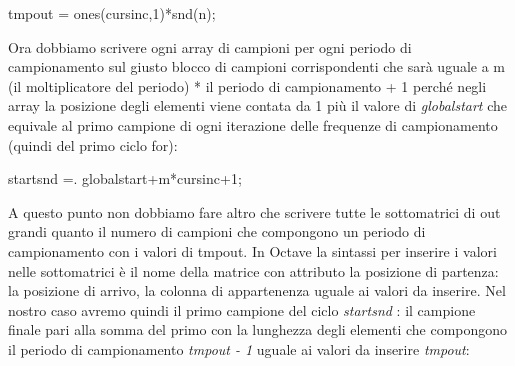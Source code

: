 \documentclass[11pt]{article}
\begin{document}
\begin{multicols*}{2}
\vspace{0.3cm}

\begin{center}
\begin{minipage}[c]{5.5cm}
\begin{sffamily}

tmpout = ones(cursinc,1)*snd(n);\\

\end{sffamily}
\end{minipage}
\end{center}

\noindent Ora dobbiamo scrivere ogni array di campioni per ogni periodo di campionamento sul giusto blocco di campioni corrispondenti che sarà uguale a m (il moltiplicatore del periodo) * il periodo di campionamento + 1 perché negli array la posizione degli elementi viene contata da 1 più il valore di \textit {globalstart} che equivale al primo campione di ogni iterazione delle frequenze di campionamento (quindi del primo ciclo for):

\vspace{0.3cm}

\begin{center}
\begin{minipage}[c]{6.3cm}
\begin{sffamily}

startsnd =. globalstart+m*cursinc+1;\\

\end{sffamily}
\end{minipage}
\end{center}

\noindent A questo punto non dobbiamo fare altro che scrivere tutte le sottomatrici di out grandi quanto il numero di campioni che compongono un periodo di campionamento con i valori di tmpout. In Octave la sintassi per inserire i valori nelle sottomatrici è il nome della matrice con attributo la posizione di partenza: la posizione di arrivo, la colonna di appartenenza uguale ai valori da inserire. Nel nostro caso avremo quindi il primo campione del ciclo \textit {startsnd} : il campione finale pari alla somma del primo con la lunghezza degli elementi che compongono il periodo di campionamento \textit {tmpout - 1} uguale ai valori da inserire \textit {tmpout}:

\vspace{0.3cm}

\begin{center}
\begin{minipage}[c]{7cm}
\begin{sffamily}


\end{sffamily}
\end{minipage}
\end{center}
\end{multicols*}
\end{document}
